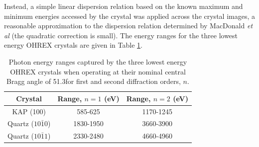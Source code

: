 Instead, a simple linear dispersion relation based on the known maximum and minimum energies accessed by the crystal was applied across the crystal images, a reasonable approximation to the dispersion relation determined by MacDonald \textit{et al} \cite{macdonaldAbsoluteThroughputCalibration2021} (the quadratic correction is small). The energy ranges for the three lowest energy OHREX crystals are given in Table \ref{tab:dispersion}.
\begin{table}
	\centering
	\begin{tabular}{ccc}
		\hline \hline
		Crystal               & Range, $n=1$ (eV) & Range, $n=2$ (eV) \\ \hline
		KAP (100)             & 585-625          & 1170-1245        \\
		Quartz ($10\bar{1}0$) & 1830-1950        & 3660-3900        \\
		Quartz ($10\bar{1}1$) & 2330-2480        & 4660-4960  \\     \hline \hline
	\end{tabular}
	\caption{\label{tab:dispersion} Photon energy ranges captured by the three lowest energy OHREX crystals when operating at their nominal central Bragg angle of 51.3\degree for first and second diffraction orders, $n$.}
\end{table}

